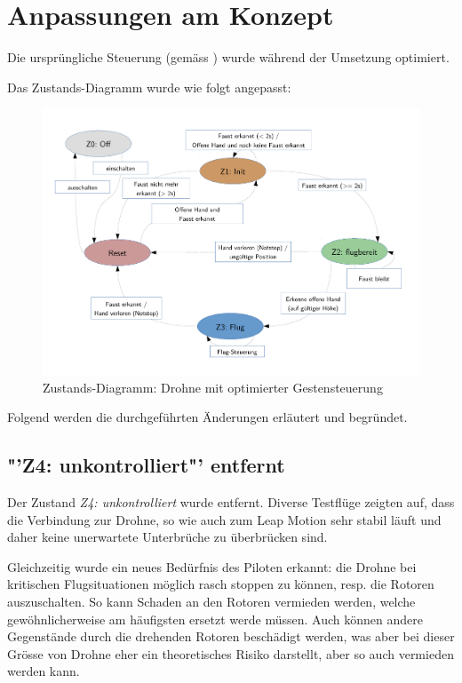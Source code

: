 \section{Anpassungen am Konzept}
\label{sec:poc:conceptChanges}
Die ursprüngliche Steuerung (gemäss ) wurde während der Umsetzung optimiert.

Das Zustands-Diagramm wurde wie folgt angepasst:
\begin{figure}[H]
	\centering
	\includegraphics[width=1.0\textwidth]{figures/concept/state-diagram-2.pdf}
	\caption[Zustands-Diagramm: Drohne mit optimierter Gestensteuerung optimiert]{Zustands-Diagramm: Drohne mit optimierter Gestensteuerung}
	\label{key}
\end{figure}

Folgend werden die durchgeführten Änderungen erläutert und begründet.

\subsection{"'Z4: unkontrolliert"' entfernt}
Der Zustand \textit{Z4: unkontrolliert} wurde entfernt.
Diverse Testflüge zeigten auf, dass die Verbindung zur Drohne, so wie auch zum Leap Motion sehr stabil läuft und daher keine unerwartete Unterbrüche zu überbrücken sind.

Gleichzeitig wurde ein neues Bedürfnis des Piloten erkannt: die Drohne bei kritischen Flugsituationen möglich rasch stoppen zu können, resp. die Rotoren auszuschalten.
So kann Schaden an den Rotoren vermieden werden, welche gewöhnlicherweise am häufigsten ersetzt werde müssen.
Auch können andere Gegenstände durch die drehenden Rotoren beschädigt werden, was aber bei dieser Grösse von Drohne eher ein theoretisches Risiko darstellt, aber so auch vermieden werden kann.

